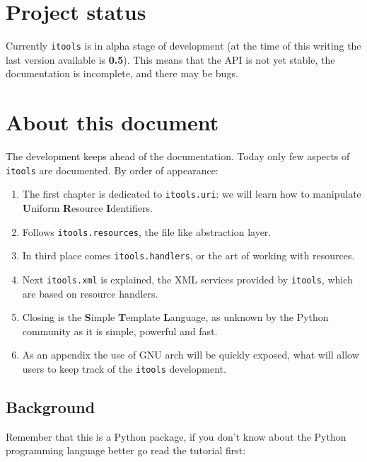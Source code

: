 \section{Project status}

Currently {\tt itools} is in alpha stage of development (at the time of
this writing the last version available is {\bf 0.5}). This means that the
API is not yet stable, the documentation is incomplete, and there may be bugs.


\section{About this document}

The development keeps ahead of the documentation. Today only few aspects
of {\tt itools} are documented. By order of appearance:

\begin{enumerate}
  \item The first chapter is dedicated to {\tt itools.uri}: we will learn how
    to manipulate {\bf U}niform {\bf R}esource {\bf I}dentifiers.

  \item Follows {\tt itools.resources}, the file like abstraction layer.

  \item In third place comes {\tt itools.handlers}, or the art of working
    with resources.

  \item Next {\tt itools.xml} is explained, the XML services provided by
    {\tt itools}, which are based on resource handlers.

  \item Closing is the {\bf S}imple {\bf T}emplate {\bf L}anguage, as unknown
    by the Python community as it is simple, powerful and fast.

  \item As an appendix the use of GNU arch will be quickly exposed, what
    will allow users to keep track of the {\tt itools} development.
\end{enumerate}


\subsection{Background}

Remember that this is a Python package, if you don't know about the Python
programming language better go read the tutorial first:

